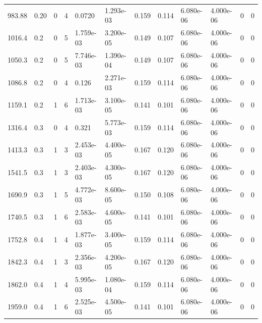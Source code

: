 \documentclass[preview]{standalone}
\begin{document}
{{\begin{tabular}{L{1.2cm}C{1.2cm} C{0.3cm}C{0.5cm} C{1.4cm}C{1.4cm} C{1.4cm}C{1.4cm} C{1.6cm}C{1.6cm} C{1.6cm}C{1.6cm}}
  983.88  &  0.20  & 0     &  4 &  0.0720  & 1.293e-03  &  0.159&   0.114& 6.080e-06 & 4.000e-06   &  0 & 0  \\ 
  1016.4  &   0.2  & 0     &  5 &  1.759e-03  & 3.200e-05  &  0.149&   0.107& 6.080e-06 & 4.000e-06   &  0 & 0  \\ 
  1050.3  &   0.2  & 0     &  5 &  7.746e-03  & 1.390e-04  &  0.149&   0.107& 6.080e-06 & 4.000e-06   &  0 & 0  \\ 
  1086.8  &   0.2  & 0     &  4 &  0.126  & 2.271e-03  &  0.159&   0.114& 6.080e-06 & 4.000e-06   &  0 & 0  \\ 
  1159.1  &   0.2  & 1     &  6 &  1.713e-03  & 3.100e-05  &  0.141&   0.101& 6.080e-06 & 4.000e-06   &  0 & 0  \\ 
  1316.4  &   0.3  & 0     &  4 &  0.321  & 5.773e-03  &  0.159&   0.114& 6.080e-06 & 4.000e-06   &  0 & 0  \\ 
  1413.3  &   0.3  & 1     &  3 &  2.453e-03  & 4.400e-05  &  0.167&   0.120& 6.080e-06 & 4.000e-06   &  0 & 0  \\ 
  1541.5  &   0.3  & 1     &  3 &  2.403e-03  & 4.300e-05  &  0.167&   0.120& 6.080e-06 & 4.000e-06   &  0 & 0  \\ 
  1690.9  &   0.3  & 1     &  5 &  4.772e-03  & 8.600e-05  &  0.150&   0.108& 6.080e-06 & 4.000e-06   &  0 & 0  \\ 
  1740.5  &   0.3  & 1     &  6 &  2.583e-03  & 4.600e-05  &  0.141&   0.101& 6.080e-06 & 4.000e-06   &  0 & 0  \\ 
  1752.8  &   0.4  & 1     &  4 &  1.877e-03  & 3.400e-05  &  0.159&   0.114& 6.080e-06 & 4.000e-06   &  0 & 0  \\ 
  1842.3  &   0.4  & 1     &  3 &  2.356e-03  & 4.200e-05  &  0.167&   0.120& 6.080e-06 & 4.000e-06   &  0 & 0  \\ 
  1862.0  &   0.4  & 1     &  4 &  5.995e-03  & 1.080e-04  &  0.159&   0.114& 6.080e-06 & 4.000e-06   &  0 & 0  \\ 
  1959.0  &   0.4  & 1     &  6 &  2.525e-03  & 4.500e-05  &  0.141&   0.101& 6.080e-06 & 4.000e-06   &  0 & 0  \\ 
\hline 
\end{tabular} 

}}
\end{document}
